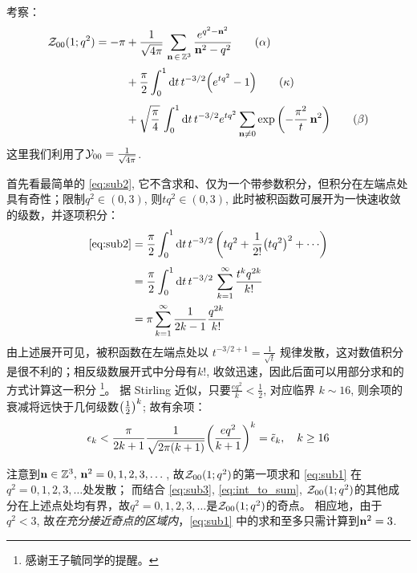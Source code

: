 \documentclass[preview,10pt,border=8pt]{standalone}
\begin{document}
	\newcommand{\zfunction}{\mcal{Z}_{00} (1;q^2)}
	考察：
	\begin{align}
		\mcal{Z}_{00} (1;q^2)
		= - \pi &+ \frac{1}{\sqrt{4\pi}}
			\sum_{\,\vb{n}\,\in\,\mbb{Z}^3}
			\frac{e^{q^2 - \vb{n}^2}}
				{\vb{n}^2 - q^2}
		\label{eq:sub1} \tag{$\alpha$} \\[.5ex]
		&+ \frac{\pi}{2}
			\int_{0}^{1} \dd{t} t^{-3/2}
				\pqty{e^{tq^2} - 1}
		\label{eq:sub2} \tag{$\kappa$}\\[1ex]
		&+ \sqrt{\frac{\pi}{4}}\,
			\int_{0}^{1} \dd{t} t^{-3/2} e^{tq^2}
			\sum_{\vb{n}\ne 0}
			\exp\pqty{-\frac{\pi^2}{t}\,\vb{n}^2}
		\label{eq:sub3} \tag{$\beta$}
	\end{align}
	这里我们利用了$\mathcal{Y}_{00} = \frac{1}{\sqrt{4\pi}}$. 
	
	首先看最简单的 \eqref{eq:sub2}, 它不含求和、仅为一个带参数积分，但积分在左端点处具有奇性；限制$q^2 \in (0,3)$, 则$tq^2 \in (0,3)$, 此时被积函数可展开为一快速收敛的级数，并逐项积分：
	\begin{equation}
	\begin{aligned}
		\eqref{eq:sub2}
		&= \frac{\pi}{2}
			\int_{0}^{1} \dd{t} t^{-3/2}\,
			\pqty{tq^2 + \frac{1}{2!} \pqty{tq^2}^2
				+ \cdots} \\[.8ex]
		&= \frac{\pi}{2}
			\int_{0}^{1} \dd{t} t^{-3/2}\,
			\sum_{k=1}^\infty
				\frac{t^k q^{2k}}{k!} \\
		&= \pi \sum_{k=1}^\infty
			\frac{1}{2k - 1} \frac{q^{2k}}{k!}
		\label{eq:int_to_sum}
	\end{aligned}
	\end{equation}
	由上述展开可见，被积函数在左端点处以
		$t^{-3/2 + 1} = \frac{1}{\sqrt{t}}$
	规律发散，这对数值积分是很不利的；相反级数展开式中分母有$k!$, 收敛迅速，因此后面可以用部分求和的方式计算这一积分%
		\footnote{感谢王子毓同学的提醒。}。
	据 Stirling 近似，只要$\frac{eq^2}{k} < \frac{1}{2}$, 对应临界
		$k \sim 16$, 
	则余项的衰减将远快于几何级数$\pqty{\frac{1}{2}}^k$; 故有余项：
	\begin{equation}
		\epsilon_k
		< \frac{\pi}{2k + 1}
			\frac{1}{\sqrt{2\pi(k+1)}}
		\pqty{\frac{eq^2}{k + 1}}^k
		= \tilde{\epsilon}_k,\quad
		k \ge 16
	\end{equation}
	\showfootnote
	
	\newparagraph
	注意到$\vb{n}\in\mathbb{Z}^3,\,\vb{n}^2 = 0,1,2,3,\dots$, 故$\zfunction$的第一项求和 \eqref{eq:sub1} 在$q^2 = 0,1,2,3,\dots$处发散；
	而结合 \eqref{eq:sub3}, \eqref{eq:int_to_sum}, $\zfunction$的其他成分在上述点处均有界，故$q^2 = 0,1,2,3,\dots$是$\zfunction$的奇点。
	相应地，由于$q^2 <3$, 故\textit{在充分接近奇点的区域内}，\eqref{eq:sub1} 中的求和至多只需计算到$\vb{n}^2 = 3$. 
	
\end{document}
